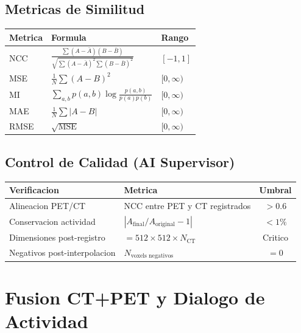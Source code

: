 \documentclass[12pt,a4paper]{article}
\begin{document}
\subsection{Metricas de Similitud}

\begin{table}[H]
\centering
\begin{tabular}{l l l}
\toprule
\textbf{Metrica} & \textbf{Formula} & \textbf{Rango} \\
\midrule
NCC & $\displaystyle\frac{\sum (A-\bar{A})(B-\bar{B})}
                {\sqrt{\sum (A-\bar{A})^2 \sum (B-\bar{B})^2}}$ & $[-1, 1]$ \\
MSE & $\displaystyle\frac{1}{N}\sum (A-B)^2$ & $[0, \infty)$ \\
MI & $\displaystyle\sum_{a,b} p(a,b)\log\frac{p(a,b)}{p(a)p(b)}$ & $[0, \infty)$ \\
MAE & $\displaystyle\frac{1}{N}\sum |A-B|$ & $[0, \infty)$ \\
RMSE & $\sqrt{\text{MSE}}$ & $[0, \infty)$ \\
\bottomrule
\end{tabular}
\end{table}

\subsection{Control de Calidad (AI Supervisor)}

\begin{table}[H]
\centering
\begin{tabular}{llc}
\toprule
\textbf{Verificacion} & \textbf{Metrica} & \textbf{Umbral} \\
\midrule
Alineacion PET/CT & NCC entre PET y CT registrados & $> 0.6$ \\
Conservacion actividad & $|A_{\text{final}}/A_{\text{original}} - 1|$ & $< 1\%$ \\
Dimensiones post-registro & $= 512 \times 512 \times N_{\text{CT}}$ & Critico \\
Negativos post-interpolacion & $N_{\text{voxels negativos}}$ & $= 0$ \\
\bottomrule
\end{tabular}
\end{table}

\newpage

\section{Fusion CT+PET y Dialogo de Actividad}
\label{sec:fusion}
\end{document}
